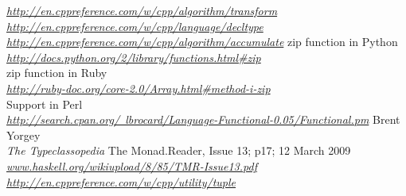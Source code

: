 \documentclass[12pt,fleqn]{article}
\begin{document}
\begin{thebibliography}{99}
\underline {\em http://en.cppreference.com/w/cpp/algorithm/transform}
\underline{\em http://en.cppreference.com/w/cpp/language/decltype}
\underline{\em http://en.cppreference.com/w/cpp/algorithm/accumulate}
zip function in Python \\
\underline{\em  http://docs.python.org/2/library/functions.html\#zip}\\
zip function in Ruby \\
\underline{\em http://ruby-doc.org/core-2.0/Array.html\#method-i-zip} \\
Support in Perl \\
\underline{\em http://search.cpan.org/~lbrocard/Language-Functional-0.05/Functional.pm}  
Brent Yorgey \\
{\em The Typeclassopedia}
The Monad.Reader, Issue 13; p17; 12 March 2009
\underline{\em www.haskell.org/wikiupload/8/85/TMR-Issue13.pdf}
\underline{\em http://en.cppreference.com/w/cpp/utility/tuple}

\end{thebibliography}
\end{document}
